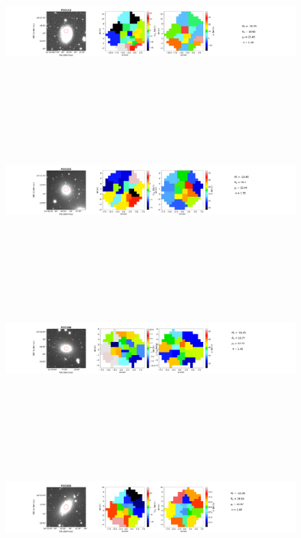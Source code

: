 \documentclass{aa}
\begin{document}
\begin{figure}[!htb]
   \ContinuedFloat
   \centering
   \includegraphics[width=21cm,height=6cm,keepaspectratio]{../2_pipeline/1_V&S_Maps/113Velocity_map.pdf}
   \includegraphics[width=21cm,height=6cm,keepaspectratio]{../2_pipeline/1_V&S_Maps/222Velocity_map.pdf}
   \includegraphics[width=21cm,height=6cm,keepaspectratio]{../2_pipeline/1_V&S_Maps/100Velocity_map.pdf}
   \includegraphics[width=21cm,height=6cm,keepaspectratio]{../2_pipeline/1_V&S_Maps/203Velocity_map.pdf}

\end{figure}
\end{document}
